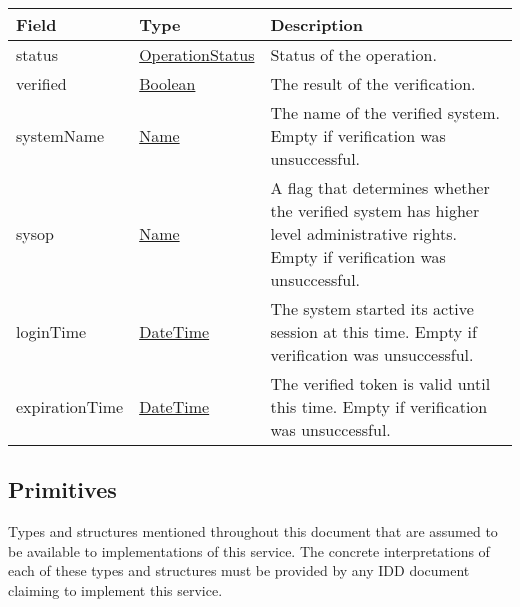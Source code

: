 \documentclass[a4paper]{arrowhead}
\newcommand{\pref}[1]{{\textcolor{ArrowheadGrey}{\hyperref[sec:model:primitives:#1]{#1}}}}
\begin{document}
 
\begin{table}[ht!]
\begin{tabularx}{\textwidth}{| p{4.25cm} | p{4cm} | X |} \hline
\rowcolor{gray!33} Field & Type      & Description \\ \hline
status & \pref{OperationStatus} & Status of the operation. \\ \hline
verified & \pref{Boolean} & The result of the verification. \\ \hline
systemName & \pref{Name} & The name of the verified system. Empty if verification was unsuccessful. \\ \hline
sysop & \pref{Name} & A flag that determines whether the verified system has higher level administrative rights. Empty if verification was unsuccessful. \\ \hline
loginTime & \pref{DateTime} & The system started its active session at this time. Empty if verification was unsuccessful. \\ \hline
expirationTime & \pref{DateTime} & The verified token is valid until this time. Empty if verification was unsuccessful. \\ \hline
\end{tabularx}
\end{table}

\subsection{Primitives}
\label{sec:model:primitives}

Types and structures mentioned throughout this document that are assumed to be available to implementations of this service.
The concrete interpretations of each of these types and structures must be provided by any IDD document claiming to implement this service.
\end{document}
